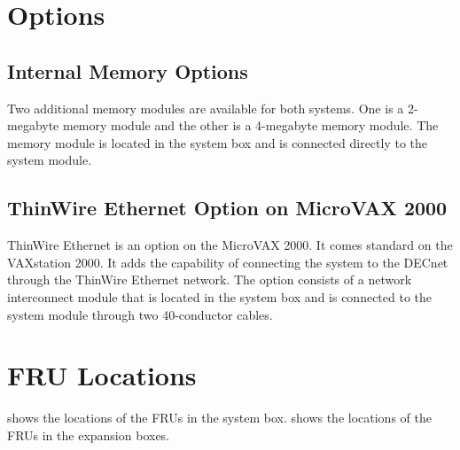 
\newpage

\section{Options}
\subsection{Internal Memory Options}

Two additional memory modules are available for both systems. One is a 
2-megabyte memory module and the other is a 4-megabyte memory module.
The memory module is located in the system box and is connected directly
to the system module.

\subsection{ThinWire Ethernet Option on MicroVAX 2000}

ThinWire Ethernet is an option on the MicroVAX 2000. It comes standard
on the VAXstation 2000. It adds the capability of connecting the system to
the DECnet through the ThinWire Ethernet network. The option consists
of a network interconnect module that is located in the system box and is
connected to the system module through two 40-conductor cables.

\section{FRU Locations}

 shows the locations of the FRUs in the system box. 
shows the locations of the FRUs in the expansion boxes.


\newpage


